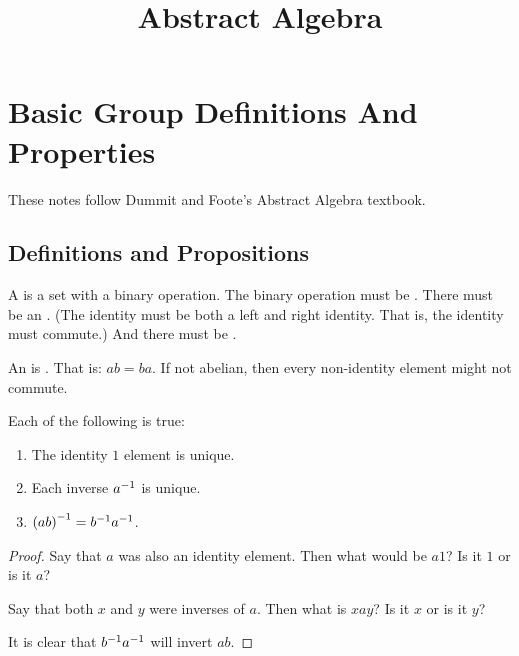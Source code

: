 \documentclass[11pt, oneside]{amsart}
\begin{document}
\title{Abstract Algebra}
\maketitle

\section{Basic Group Definitions And Properties}

\begin{remark}
  These notes follow Dummit and Foote's Abstract Algebra textbook.
\end{remark}

\subsection{Definitions and Propositions}

\begin{definition}
  A  is a set with a binary operation. The binary
  operation must be . There must be an
  . (The identity must be both a left and right
  identity. That is, the identity must commute.) And there must be
  .

  An  is . That is: $ab = ba$.
  If not abelian, then every non-identity element might not commute.
\end{definition}

\begin{proposition} Each of the following is true:
  \begin{enumerate}
    \item The identity $1$ element is unique.
    \item Each inverse ${a}^{-1}$ is unique.
    \item $\mathopen{}\left( {ab} \right)^{-1}\mathclose{} = {b}^{-1} {a}^{-1}$.
  \end{enumerate}
\end{proposition}

\begin{proof}
  Say that $a$ was also an identity element. Then what would be $a1$? Is
  it $1$ or is it $a$?

  Say that both $x$ and $y$ were inverses of $a$. Then what is $xay$? Is
  it $x$ or is it $y$?

  It is clear that ${b}^{-1}{a}^{-1}$ will invert $ab$.
\end{proof}
\end{document}
